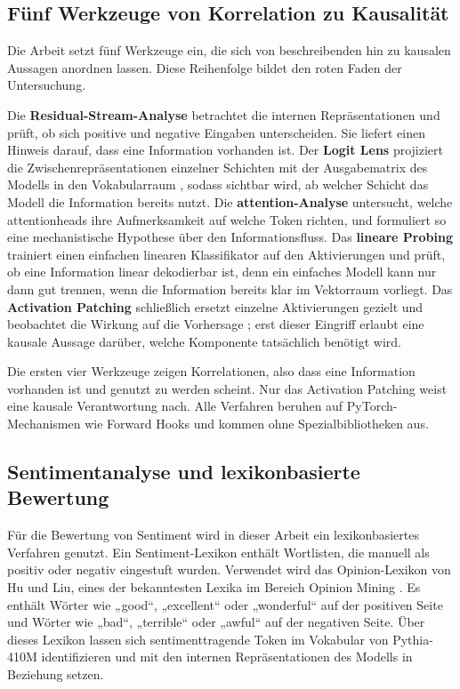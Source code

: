 \subsection{Fünf Werkzeuge von Korrelation zu Kausalität}

Die Arbeit setzt fünf Werkzeuge ein, die sich von beschreibenden hin zu kausalen Aussagen anordnen lassen. Diese Reihenfolge bildet den roten Faden der Untersuchung.

Die \textbf{Residual-Stream-Analyse} betrachtet die internen Repräsentationen und prüft, ob sich positive und negative Eingaben unterscheiden. Sie liefert einen Hinweis darauf, dass eine Information vorhanden ist. Der \textbf{Logit Lens} projiziert die Zwischenrepräsentationen einzelner Schichten mit der Ausgabematrix des Modells in den Vokabularraum \cite{nostalgebraist2020logit}, sodass sichtbar wird, ab welcher Schicht das Modell die Information bereits nutzt. Die \textbf{\gls{attention}-Analyse} untersucht, welche \glspl{attentionhead} ihre Aufmerksamkeit auf welche Token richten, und formuliert so eine mechanistische Hypothese über den Informationsfluss. Das \textbf{lineare Probing} trainiert einen einfachen linearen Klassifikator auf den Aktivierungen und prüft, ob eine Information linear dekodierbar ist, denn ein einfaches Modell kann nur dann gut trennen, wenn die Information bereits klar im Vektorraum vorliegt. Das \textbf{Activation Patching} schließlich ersetzt einzelne Aktivierungen gezielt und beobachtet die Wirkung auf die Vorhersage \cite{meng2022locating, goldowskydill2023localizing}; erst dieser Eingriff erlaubt eine kausale Aussage darüber, welche Komponente tatsächlich benötigt wird.

Die ersten vier Werkzeuge zeigen Korrelationen, also dass eine Information vorhanden ist und genutzt zu werden scheint. Nur das Activation Patching weist eine kausale Verantwortung nach. Alle Verfahren beruhen auf PyTorch-Mechanismen wie Forward Hooks und kommen ohne Spezialbibliotheken aus.

\subsection{Sentimentanalyse und lexikonbasierte Bewertung}

Für die Bewertung von Sentiment wird in dieser Arbeit ein lexikonbasiertes Verfahren genutzt. Ein Sentiment-Lexikon enthält Wortlisten, die manuell als positiv oder negativ eingestuft wurden. Verwendet wird das Opinion-Lexikon von Hu und Liu, eines der bekanntesten Lexika im Bereich Opinion Mining \cite{hu2004mining}. Es enthält Wörter wie „good“, „excellent“ oder „wonderful“ auf der positiven Seite und Wörter wie „bad“, „terrible“ oder „awful“ auf der negativen Seite. Über dieses Lexikon lassen sich sentimenttragende Token im Vokabular von Pythia-410M identifizieren und mit den internen Repräsentationen des Modells in Beziehung setzen.

